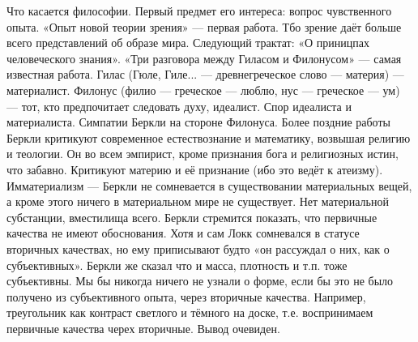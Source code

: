 Что касается философии. Первый предмет его интереса: вопрос чувственного опыта. «Опыт новой теории зрения» --- первая работа. Тбо зрение даёт больше всего представлений об образе мира. Следующий трактат: «О приницпах человеческого знания». «Три разговора между Гиласом и Филонусом» --- самая известная работа. 
Гилас (Гюле, Гиле... --- древнегреческое слово --- материя) --- материалист. Филонус (филио --- греческое --- люблю, нус --- греческое --- ум) --- тот, кто предпочитает следовать духу, идеалист. Спор идеалиста и материалиста. Симпатии Беркли на стороне Филонуса.
Более поздние работы Беркли критикуют современное естествознание и математику, возвышая религию и теологии.
Он во всем эмпирист, кроме признания бога и религиозных истин, что забавно. Критикуют материю и её признание (ибо это ведёт к атеизму). Имматериализм --- Беркли не сомневается в существовании материальных вещей, а кроме этого ничего в материальном мире не существует. Нет материальной субстанции, вместилища всего.
Беркли стремится показать, что первичные качества не имеют обоснования. Хотя и сам Локк сомневался в статусе вторичных качествах, но ему приписывают будто «он рассуждал о них, как о субъективных». Беркли же сказал что и масса, плотность и т.п. тоже субъективны. Мы бы никогда ничего не узнали о форме, если бы это не было получено из субъективного опыта, через вторичные качества. Например, треугольник как контраст светлого и тёмного на доске, т.е. воспринимаем первичные качества черех вторичные. Вывод очевиден.